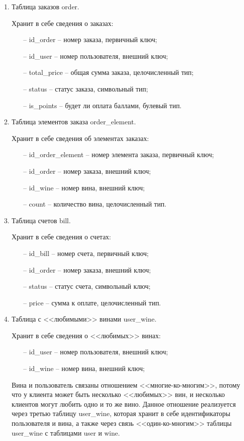 \begin{enumerate}[label=\arabic*)]
	\item Таблица заказов order.

Хранит в себе сведения о заказах:
    \begin{itemize}
        \item[--] id\_order -- номер заказа, первичный ключ;
         \item[--] id\_user -- номер пользователя, внешний ключ;
         \item[--] total\_price -- общая сумма заказа, целочисленный тип;
         \item[--] status -- статус заказа, символьный тип;
         \item[--] is\_points -- будет ли оплата баллами, булевый тип.
    \end{itemize}

        \item Таблица элементов заказа order\_element.
        
Хранит в себе сведения об элементах заказах:
    \begin{itemize}
        \item[--] id\_order\_element -- номер элемента заказа, первичный ключ;
        \item[--] id\_order -- номер заказа, внешний ключ;
         \item[--] id\_wine -- номер вина, внешний ключ;
         \item[--] count -- количество вина, целочисленный тип.
    \end{itemize} 
        
        \item Таблица счетов bill.
        
        Хранит в себе сведения о счетах:
    \begin{itemize}
        \item[--] id\_bill -- номер счета, первичный ключ;
        \item[--] id\_order -- номер заказа, внешний ключ;
         \item[--] status -- статус счета, символьный ключ;
         \item[--] price -- сумма к оплате, целочисленный тип.
    \end{itemize} 

     \item Таблица с <<любимыми>> винами user\_wine.
     
        Хранит в себе сведения о <<любимых>> винах:
    \begin{itemize}
        \item[--] id\_user -- номер пользователя, внешний ключ;
        \item[--] id\_wine -- номер вина, внешний ключ;
    \end{itemize} 

    Вина и пользователь связаны отношением <<многие-ко-многим>>, потому что у клиента может быть несколько <<любимых>> вин, и несколько клиентов могут любить одно и то же вино. Данное отношение реализуется через третью таблицу user\_wine, которая хранит в себе идентификаторы пользователя и вина, а также через связь <<один-ко-многим>> таблицы user\_wine с таблицами user и wine.
\end{enumerate}

